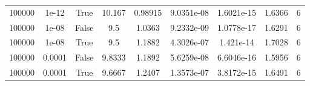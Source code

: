 \begin{table}
\begin{tabular}{ccccccccc}
100000 & 1e-12 & True & 10.167 & 0.98915 & 9.0351e-08 & 1.6021e-15 & 1.6366 & 6 \\
100000 & 1e-08 & False & 9.5 & 1.0363 & 9.2332e-09 & 1.0778e-17 & 1.6291 & 6 \\
100000 & 1e-08 & True & 9.5 & 1.1882 & 4.3026e-07 & 1.421e-14 & 1.7028 & 6 \\
100000 & 0.0001 & False & 9.8333 & 1.1892 & 5.6259e-08 & 6.6046e-16 & 1.5956 & 6 \\
100000 & 0.0001 & True & 9.6667 & 1.2407 & 1.3573e-07 & 3.8172e-15 & 1.6491 & 6 \\
\bottomrule
\end{tabular}
\end{table}
